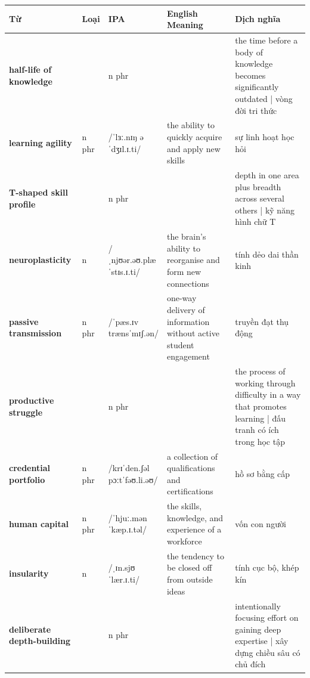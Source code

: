 \separator


\vspace{0.8em}
\begin{center}
\renewcommand{\arraystretch}{1.65}
\begin{tabularx}{\textwidth}{|V{0.22\textwidth}|C{0.07\textwidth}|I{0.20\textwidth}|Y|V{0.18\textwidth}|}
\hline
{}
\textbf{Từ} & \textbf{Loại} & \textbf{IPA} & \textbf{English Meaning} & \textbf{Dịch nghĩa} \\
\hline
\textbf{half-life of knowledge} & & n phr & & the time before a body of knowledge becomes significantly outdated | vòng đời tri thức \\ \hline
\textbf{learning agility} & n phr & /ˈlɜː.nɪŋ əˈdʒɪl.ɪ.ti/ & the ability to quickly acquire and apply new skills & sự linh hoạt học hỏi \\ \hline
\textbf{T-shaped skill profile} & & n phr & & depth in one area plus breadth across several others | kỹ năng hình chữ T \\ \hline
\textbf{neuroplasticity} & n & /ˌnjʊər.əʊ.plæˈstɪs.ɪ.ti/ & the brain's ability to reorganise and form new connections & tính dẻo dai thần kinh \\ \hline
\textbf{passive transmission} & n phr & /ˈpæs.ɪv trænsˈmɪʃ.ən/ & one-way delivery of information without active student engagement & truyền đạt thụ động \\ \hline
\textbf{productive struggle} & & n phr & & the process of working through difficulty in a way that promotes learning | đấu tranh có ích trong học tập \\ \hline
\textbf{credential portfolio} & n phr & /krɪˈden.ʃəl pɔːtˈfəʊ.li.əʊ/ & a collection of qualifications and certifications & hồ sơ bằng cấp \\ \hline
\textbf{human capital} & n phr & /ˈhjuː.mən ˈkæp.ɪ.təl/ & the skills, knowledge, and experience of a workforce & vốn con người \\ \hline
\textbf{insularity} & n & /ˌɪn.sjʊˈlær.ɪ.ti/ & the tendency to be closed off from outside ideas & tính cục bộ, khép kín \\ \hline
\textbf{deliberate depth-building} & & n phr & & intentionally focusing effort on gaining deep expertise | xây dựng chiều sâu có chủ đích \\ \hline
\end{tabularx}
\end{center}

\newpage

